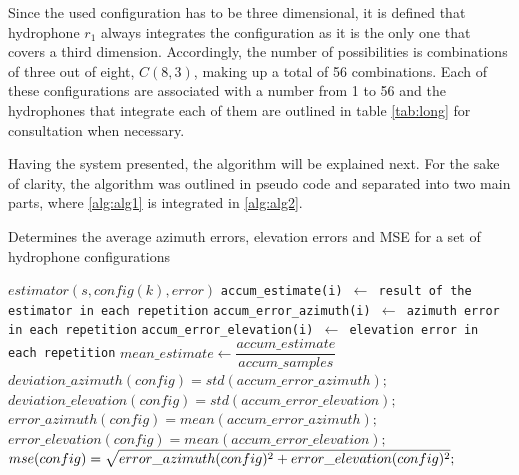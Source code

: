 Since the used configuration has to be three dimensional, it is defined that hydrophone $r_1$ always integrates the configuration as it is the only one that covers a third dimension. Accordingly, the number of possibilities is combinations of three out of eight, $C(8,3)$, making up a total of 56 combinations. Each of these configurations are associated with a number from 1 to 56 and the hydrophones that integrate each of them are outlined in table \ref{tab:long} for consultation when necessary.

Having the system presented, the algorithm will be explained next. For the sake of clarity, the algorithm was outlined in pseudo code and separated into two main parts, where \ref{alg:alg1} is integrated in \ref{alg:alg2}.

\begin{algorithm}
	\scriptsize		%
	\caption{Determines the average azimuth errors, elevation errors and MSE for a set of hydrophone configurations}
	\label{alg:alg1}
	\begin{algorithmic}[1]
		\STATE\texttt{$estimator(s, config(k), error)$}
		\STATE \texttt{accum\_estimate(i) $\gets$ result of the estimator in each repetition} 
		\STATE \texttt{accum\_error\_azimuth(i) $\gets$ azimuth error in each repetition} 
		\STATE \texttt{accum\_error\_elevation(i) $\gets$ elevation error in each repetition} 
		\ENDFOR
		\STATE $mean\_estimate \gets \dfrac{accum\_estimate}{accum\_samples}$
		\STATE
		\STATE $deviation\_azimuth(config) = std(accum\_error\_azimuth);$
		\STATE $deviation\_elevation(config) = std(accum\_error\_elevation);$
		\STATE $error\_azimuth(config) = mean(accum\_error\_azimuth);$
		\STATE $error\_elevation(config) = mean(accum\_error\_elevation);$
		\STATE
		\STATE $mse(config) = \sqrt{\rule{0pt}{8pt}error\_azimuth(config)^{2} + error\_elevation(config)^{2}};$
		\ENDFOR
	\end{algorithmic}
\end{algorithm}


